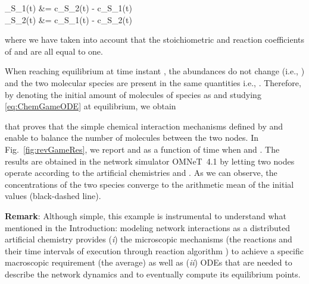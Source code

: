 \documentclass[journal]{IEEEtran}
\newcommand{\mol}[1]{\ensuremath{\textrm{#1}}}
\begin{document}
{	 _{\mol{S}_1}(t) &= c_{\mol{S}_2}(t) - c_{\mol{S}_1}(t)\label{eq:ChemGameODE1}\\
	 _{\mol{S}_2}(t) &= c_{\mol{S}_1}(t) - c_{\mol{S}_2}(t) \label{eq:ChemGameODE2}
 
{where we have taken into account that the stoichiometric and reaction coefficients of  and  are all equal to one.}

When reaching equilibrium at time instant , the abundances do not change (i.e., ) and the two molecular species are present in the same quantities i.e., . Therefore, by denoting the initial amount of molecules of species  as  and {studying \eqref{eq:ChemGameODE} at equilibrium}{,} we obtain 

{{that proves that the simple} {chemical interaction mechanisms} defined by  and  enable to balance the number of molecules between the two nodes. In Fig.~\ref{fig:revGameRes}, we report  and  as a function of time  when  and . The results are obtained in the network simulator OMNeT~4.1 by letting two nodes operate according to the artificial chemistries  and . As we can observe, the concentrations of the two species converge to the arithmetic mean of the initial values (black-dashed line).}

{{\bf{Remark}}: Although simple, this example is instrumental to understand what mentioned in the Introduction: modeling network interactions as a distributed artificial chemistry  provides (\emph{i}) the microscopic mechanisms (the reactions and their time intervals of execution through reaction algorithm ) to achieve a specific macroscopic requirement (the average) as well as (\emph{ii}) ODEs that are needed to describe the network dynamics and to eventually compute its equilibrium points.}


}
\end{document}
